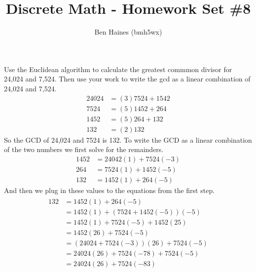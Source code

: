 \documentclass[paper=a4, fontsize=11pt]{jhwhw} %
\begin{document}
\title{Discrete Math - Homework Set \#8}
\author{Ben Haines (bmh5wx)}
Use the Euclidean algorithm to calculate the greatest commmon divisor for 24,024 and 7,524. Then use your work to write the gcd as a linear combination of 24,024 and 7,524.
\solution
\begin{align*}
    24024 &= (3)7524 + 1542\\
    7524 &= (5)1452 + 264\\
    1452 &= (5)264 + 132\\
    132 &= (2)132
\end{align*}
So the GCD of 24,024 and 7524 is 132. To write the GCD as a linear combination of the two numbers we first solve for the remainders.
\begin{align*}
    1452 &= 24042(1) + 7524(-3)\\
    264 &= 7524(1) + 1452(-5)\\
    132 &= 1452(1) + 264(-5)
\end{align*}
And then we plug in these values to the equations from the first step.
\begin{align}
    \begin{split}
        132 &= 1452(1) + 264(-5)\\
            &= 1452(1) + (7524 + 1452(-5))(-5)\\
            &= 1452(1) + 7524(-5) + 1452(25)\\
            &= 1452(26) + 7524(-5)\\
            &= (24024 + 7524(-3))(26) + 7524(-5)\\
            &= 24024(26) + 7524(-78) + 7524(-5)\\
            &= 24024(26) + 7524(-83)
    \end{split}
\end{align}
\end{document}
